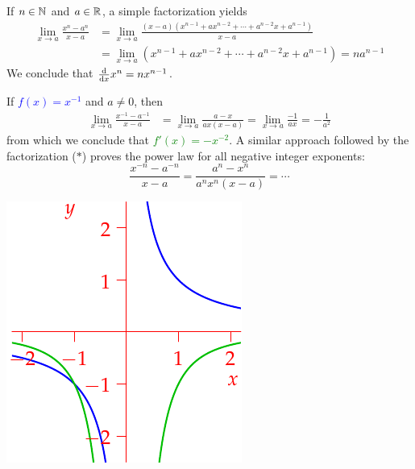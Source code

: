 \begin{examples}{}{}
	\exstart If $n\in\mathbb{N}$ and $a\in\mathbb{R}$, a simple factorization yields
	\begin{align*}
		\lim_{x\to a}\frac{x^n-a^n}{x-a}
		&=\lim_{x\to a}\frac{(x-a)(x^{n-1}+ax^{n-2}+\cdots +a^{n-2}x+a^{n-1})}{x-a}\tag{$\ast$}\\
		&=\lim_{x\to a}(x^{n-1}+ax^{n-2}+\cdots +a^{n-2}x+a^{n-1}) 
		=na^{n-1}
	\end{align*}
	We conclude that $\frac{\mathrm{d} }{\mathrm{d} x} x^n=nx^{n-1}$.
	\begin{enumerate}\setcounter{enumi}{1}
		\begin{minipage}[t]{0.68\linewidth}\vspace{0pt}
			\item If \textcolor{blue}{$f(x)=x^{-1}$} and $a\neq 0$, then
			\begin{align*}
				\lim_{x\to a}\frac{x^{-1}-a^{-1}}{x-a}
				&=\lim_{x\to a}\frac{a-x}{ax(x-a)} 
				=\lim_{x\to a}\frac{-1}{ax}=-\frac 1{a^2}
			\end{align*}
			from which we conclude that \textcolor{Green}{$f'(x)=-x^{-2}$}.\smallbreak
			A similar approach followed by the factorization ($\ast$) proves the power law for all negative integer exponents:
			\[
				\frac{x^{-n}-a^{-n}}{x-a}=\frac{a^n-x^n}{a^nx^n(x-a)}=\cdots
			\]
		\end{minipage}
		\hfill
		\begin{minipage}[t]{0.3\linewidth}\vspace{-10pt}
			\flushright\includegraphics[scale=0.95]{diff-exneg2}
		\end{minipage}
		\bigbreak
	

\end{enumerate}
\end{examples}
